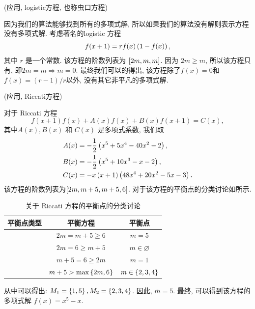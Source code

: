 \begin{example}
(应用, logistic方程, 也称虫口方程)

因为我们的算法能够找到所有的多项式解, 所以如果我们的算法没有解则表示方程没有多项式解. 考虑著名的logistic 方程\cite{may1976simple}
\begin{equation}
    f(x+1)=r f(x)\left(1-f(x)\right),
\end{equation}
其中 $r$ 是一个常数. 该方程的阶数列表为 $\left[2m,m,m\right]$. 因为 $2m\ge m$, 所以该方程只有\BPone{}, 即$2m=m\Rightarrow m=0$. 最终我们可以的得出, 该方程除了$f(x)=0$和$f(x)=(r-1)/r$以外, 没有其它非平凡的多项式解.
\end{example}

\begin{example}
(应用, Riccati方程)

对于 Riccati 方程\cite{bittanti2012riccati}
\begin{equation}
    f(x+1)f(x)+A(x)f(x)+B(x)f(x+1)=C(x), \label{raeq}
\end{equation} 
其中$A(x),B(x)$ 和 $C(x)$ 是多项式系数, 我们取 
\begin{equation}
\begin{split}
A(x)&= -\frac{1}{2}\left(x^5+5x^4-40x^2-2\right), \\ 
B(x)&= -\frac{1}{2}\left(x^5+10x^3-x-2\right), \\ 
C(x)&= -x\left(x+1\right)\left(48x^4+20x^2-5x-3\right).
\end{split}
\end{equation}
该方程的阶数列表为$\left[2m,m+5,m+5,6\right]$. 对于该方程的平衡点的分类讨论如所示.

\begin{table}[htbp]
\centering
\caption{关于 Riccati 方程的平衡点的分类讨论}\label{tb}
\begin{tabular}{ccc}
\hline
平衡点类型 & 平衡方程 & 平衡点  \\ 
\hline
\BPone{}  & $2m=m+5\ge 6$            & $m=5$             \\ 
\BPone{}  & $2m=6\ge m+5$            & $m\in \varnothing$             \\ 
\BPone{}  & $m+5=6\ge 2m$            & $m=1$             \\ 
\BPtwo{}  & $m+5>\max\left\{2m,6\right\}$  & $m\in \left\{2,3,4\right\}$ \\
\hline
\end{tabular}
\end{table}
从中可以得出: $M_1=\left\{1,5\right\},M_2=\left\{2,3,4\right\}$. 因此, $\overline m=5$. 最终, 可以得到该方程的多项式解 $f(x)=x^5-x$. 


\end{example}
